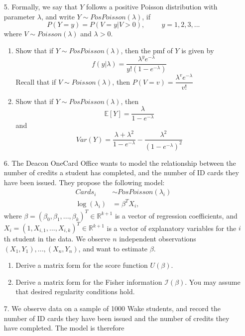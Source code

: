 \documentclass[11pt]{article}
\begin{document}
\begin{enumerate}
\item[5.] Formally, we say that $Y$ follows a positive Poisson distribution with parameter $\lambda$, and write $Y \sim PosPoisson(\lambda)$, if
$$P(Y = y) = P(V = y | V > 0), \hspace{1cm} y = 1, 2, 3, ...$$
where $V \sim Poisson(\lambda)$ and $\lambda > 0$.
\begin{enumerate}
\item Show that if $Y \sim PosPoisson(\lambda)$, then the pmf of $Y$ is given by
$$f(y|\lambda) = \frac{\lambda^y e^{-\lambda}}{y! (1 - e^{-\lambda})}$$
Recall that if $V \sim Poisson(\lambda)$, then $P(V = v) = \dfrac{\lambda^v e^{-\lambda}}{v!}$

\item Show that if $Y \sim PosPoisson(\lambda)$, then
$$\mathbb{E}[Y] = \frac{\lambda}{1 - e^{-\lambda}}$$
and
$$Var(Y) = \frac{\lambda + \lambda^2}{1 - e^{-\lambda}} - \frac{\lambda^2}{(1 - e^{-\lambda})^2}$$
\end{enumerate}

\item[6.] The Deacon OneCard Office wants to model the relationship between the number of credits a student has completed, and the number of ID cards they have been issued. They propose the following model:
\begin{align*}
Cards_i &\sim PosPoisson(\lambda_i) \\
\log(\lambda_i) &= \beta^T X_i,
\end{align*}
where $\beta = (\beta_0, \beta_1,...,\beta_k)^T \in \mathbb{R}^{k+1}$ is a vector of regression coefficients, and $X_i = (1, X_{i,1},...,X_{i,k})^T \in \mathbb{R}^{k+1}$ is a vector of explanatory variables for the $i$th student in the data. We observe $n$ independent observations $(X_1, Y_1),...,(X_n, Y_n)$, and want to estimate $\beta$.

\begin{enumerate}
\item Derive a matrix form for the score function $U(\beta)$.

\item Derive a matrix form for the Fisher information $\mathcal{I}(\beta)$. You may assume that desired regularity conditions hold.
\end{enumerate}

\item[7.] We observe data on a sample of 1000 Wake students, and record the number of ID cards they have been issued and the number of credits they have completed. The model is therefore 


\end{enumerate}
\end{document}
